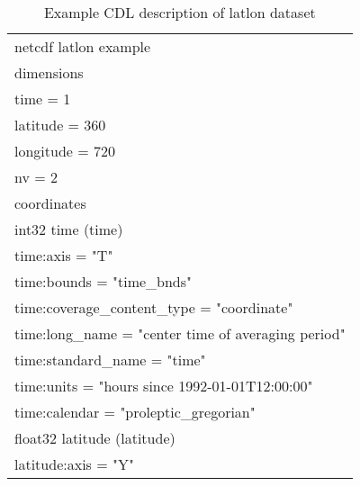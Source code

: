 \begin{longtable}{|p{\textwidth}|}
\caption{Example CDL description of latlon dataset}
\label{tab:cdl-latlon} \\
\hline \endhead
\hline \endfoot
netcdf latlon example\\
dimensions\\
\hline
\rowcolor{YellowGreen}  time = 1\\
\rowcolor{YellowGreen}  latitude = 360\\
\rowcolor{YellowGreen}  longitude = 720\\
\rowcolor{YellowGreen}  nv = 2\\
\hline

coordinates\\
\hline
\rowcolor{Apricot}\hspace{0.5cm}int32 time (time)\\
\rowcolor{Apricot}\hspace{0.5cm}\hspace{0.5cm}time:axis = "T"\\
\rowcolor{Apricot}\hspace{0.5cm}\hspace{0.5cm}time:bounds = "time\_bnds"\\
\rowcolor{Apricot}\hspace{0.5cm}\hspace{0.5cm}time:coverage\_content\_type = "coordinate"\\
\rowcolor{Apricot}\hspace{0.5cm}\hspace{0.5cm}time:long\_name = "center time of averaging period"\\
\rowcolor{Apricot}\hspace{0.5cm}\hspace{0.5cm}time:standard\_name = "time"\\
\rowcolor{Apricot}\hspace{0.5cm}\hspace{0.5cm}time:units = "hours since 1992-01-01T12:00:00"\\
\rowcolor{Apricot}\hspace{0.5cm}\hspace{0.5cm}time:calendar = "proleptic\_gregorian"\\
\rowcolor{Apricot}\hspace{0.5cm}float32 latitude (latitude)\\
\rowcolor{Apricot}\hspace{0.5cm}\hspace{0.5cm}latitude:axis = "Y"\\

\end{longtable}
